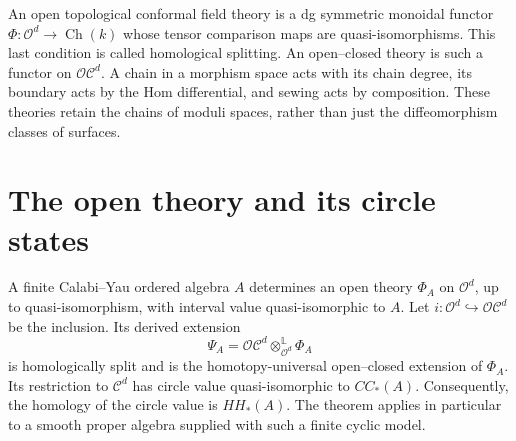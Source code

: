 An open topological conformal field theory is a dg symmetric monoidal functor $\Phi:\mathcal O^d\to\operatorname{Ch}(k)$ whose tensor comparison maps are quasi-isomorphisms.
This last condition is called homological splitting.
An open--closed theory is such a functor on $\mathcal{OC}^d$.
A chain in a morphism space acts with its chain degree, its boundary acts by the Hom differential, and sewing acts by composition.
These theories retain the chains of moduli spaces, rather than just the diffeomorphism classes of surfaces.

\section{The open theory and its circle states}

\begin{theorem}\label{cbc:cyclic:surface}
A finite Calabi--Yau ordered algebra $A$ determines an open theory $\Phi_A$ on $\mathcal O^d$, up to quasi-isomorphism, with interval value quasi-isomorphic to $A$.
Let $i:\mathcal O^d\hookrightarrow\mathcal{OC}^d$ be the inclusion.
Its derived extension
\begin{equation}\label{eq:cbc:cyclic:extension}
 \Psi_A=\mathcal{OC}^d\otimes_{\mathcal O^d}^{\mathbb L}\Phi_A
\end{equation}
is homologically split and is the homotopy-universal open--closed extension of $\Phi_A$.
Its restriction to $\mathcal C^d$ has circle value quasi-isomorphic to $CC_*(A)$.
Consequently, the homology of the circle value is $HH_*(A)$.
The theorem applies in particular to a smooth proper algebra supplied with such a finite cyclic model.
\end{theorem}
